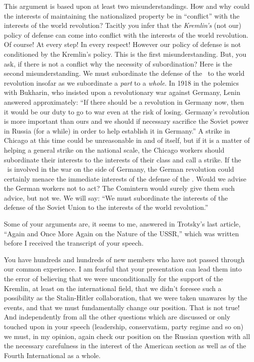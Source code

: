This argument is based upon at least two misunderstandings. How and why could the interests of maintaining the nationalized property be in “conflict” with the interests of the world revolution? Tacitly you infer that the \emph{Kremlin’s} (not our) policy of defense can come into conflict with the interests of the world revolution. Of course! At every step! In every respect! However our policy of defense is not conditioned by the Kremlin’s policy. This is the first misunderstanding. But, you ask, if there is not a conflict why the necessity of subordination? Here is the second misunderstanding. We must subordinate the defense of the \USSR\ to the world revolution insofar as we subordinate a \emph{part} to a \emph{whole}. In 1918 in the polemics with Bukharin, who insisted upon a revolutionary war against Germany, Lenin answered approximately: “If there should be a revolution in Germany now, then it would be our duty to go to war even at the risk of losing. Germany’s revolution is more important than ours and we should if necessary sacrifice the Soviet power in Russia (for a while) in order to help establish it in Germany.” A strike in Chicago at this time could be unreasonable in and of itself, but if it is a matter of helping a general strike on the national scale, the Chicago workers should subordinate their interests to the interests of their class and call a strike. If the \USSR\ is involved in the war on the side of Germany, the German revolution could certainly menace the immediate interests of the defense of the \USSR. Would we advise the German workers not to act? The Comintern would surely give them such advice, but not we. We will say: “We must subordinate the interests of the defense of the Soviet Union to the interests of the world revolution.”
\nowidow

Some of your arguments are, it seems to me, answered in Trotsky’s last article, ``Again and Once More Again on the Nature of the USSR,'' which was written before I received the transcript of your speech.

You have hundreds and hundreds of new members who have not passed through our common experience. I am fearful that your presentation can lead them into the error of believing that we were unconditionally for the support of the Kremlin, at least on the international field, that we didn’t foresee such a possibility as the Stalin-Hitler collaboration, that we were taken unawares by the events, and that we must fundamentally change our position. That is not true! And independently from all the other questions which are discussed or only touched upon in your speech (leadership, conservatism, party regime and so on) we must, in my opinion, again check our position on the Russian question with all the necessary carefulness in the interest of the American section as well as of the Fourth International as a whole.

